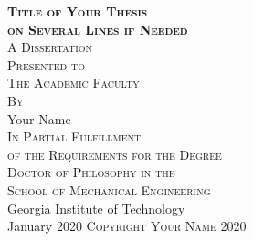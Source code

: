
\newcommand{\thesisTitle}{Title of Your Thesis\\on Several Lines if Needed}
\newcommand{\yourName}{Your Name}
\newcommand{\yourSchool}{Mechanical Engineering}
\newcommand{\yourMonth}{January}
\newcommand{\yourYear}{2020}


\begin{titlepage}
\begin{center}

\begin{singlespacing}

{\Large\textbf{\textsc{\thesisTitle}}}\\
\vspace{10\baselineskip}
{\footnotesize \textsc{A Dissertation}}\\
{\footnotesize \textsc{Presented to}}\\
{\footnotesize \textsc{The Academic Faculty}}\\
\vspace{2\baselineskip}
{\footnotesize \textsc{By}}\\
\vspace{2\baselineskip}
\large\yourName\\
\vspace{2\baselineskip}
{\footnotesize \textsc{In Partial Fulfillment}}\\
{\footnotesize \textsc{of the Requirements for the Degree}}\\
{\footnotesize \textsc{Doctor of Philosophy in the}}\\
{\footnotesize \textsc{School of \yourSchool}}\\
\vspace{2\baselineskip}
{\large Georgia Institute of Technology}\\
\vspace{\baselineskip}
{\large \yourMonth{} \yourYear{}}
\vfill
\normalsize{\textsc{Copyright \textcopyright{} \yourName{} \yourYear{}}}
\vspace{\baselineskip}

\end{singlespacing}

\end{center}
\end{titlepage}


